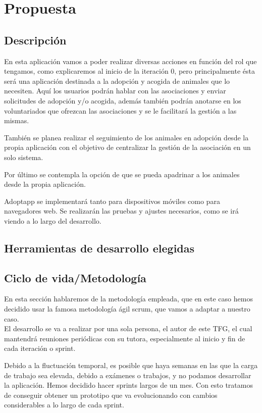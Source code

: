 \section{Propuesta}

\subsection{Descripción}
En esta aplicación vamos a poder realizar diversas acciones en función del rol que tengamos, como explicaremos al inicio de la iteración 0, pero principalmente ésta será una aplicación destinada a la adopción y acogida de animales que lo necesiten. Aquí los usuarios podrán hablar con las asociaciones y enviar solicitudes de adopción y/o acogida, además también podrán anotarse en los voluntariados que ofrezcan las asociaciones y se le facilitará la gestión a las mismas.

También se planea realizar el seguimiento de los animales en adopción desde la propia aplicación con el objetivo de centralizar la gestión de la asociación en un solo sistema.

Por último se contempla la opción de que se pueda apadrinar a los animales desde la propia aplicación.

Adoptapp se implementará tanto para dispositivos móviles como para navegadores web. Se realizarán las pruebas y ajustes necesarios, como se irá viendo a lo largo del desarrollo.

\subsection{Herramientas de desarrollo elegidas}

\subsection{Ciclo de vida/Metodología}
En esta sección hablaremos de la metodología empleada, que en este caso hemos decidido usar la famosa metodología ágil scrum, que vamos a adaptar a nuestro caso. \\

El desarrollo se va a realizar por una sola persona, el autor de este TFG, el cual mantendrá reuniones periódicas con su tutora, especialmente al inicio y fin de cada iteración o sprint.

Debido a la fluctuación temporal, es posible que haya semanas en las que la carga de trabajo sea elevada, debido a exámenes o trabajos, y no podamos desarrollar la aplicación. Hemos decidido hacer sprints largos de un mes. Con esto tratamos de conseguir obtener un prototipo que va evolucionando con cambios considerables a lo largo de cada sprint.

